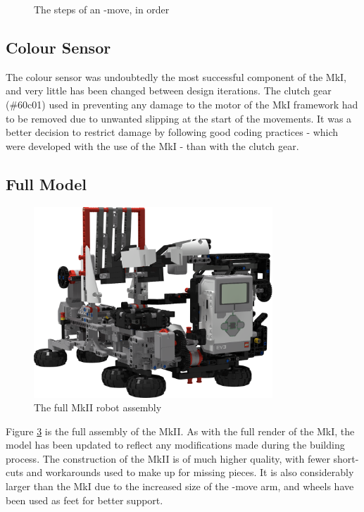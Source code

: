 \documentclass{report}
\newcommand{\legopiece}[1]{(\##1)}
\newcommand{\move}[1]{\uppercase{\texttt{\formatmovesnospace{#1}}}-move}
\begin{document}
\begin{figure}[H]
\begin{subfigure}[b]{0.25\textwidth}
    		\caption{}
    		\label{fig:rdrXMoveArmRaised}
    	\end{subfigure}
    	\caption{The steps of an \move{x}, in order}
    	\label{fig:rdrXMoveRenders}
    \end{figure}
    
    
    \subsection{Colour Sensor}
    
    The colour sensor was undoubtedly the most successful component of the MkI, and very little has been changed between design iterations. The clutch gear \legopiece{60c01} used in preventing any damage to the motor of the MkI framework had to be removed due to unwanted slipping at the start of the movements. It was a better decision to restrict damage by following good coding practices - which were developed with the use of the MkI - than with the clutch gear.
    
    \subsection{Full Model}
    
   	\begin{figure}[H]
    	\centering
   		\includegraphics[width=0.8\textwidth]{Resources/Images/rdrMkIIFull.png}
   		\caption{The full MkII robot assembly}
   		\label{fig:rdrMkIIFull}
    \end{figure}
    
    Figure \ref{fig:rdrMkIIFull} is the full assembly of the MkII. As with the full render of the MkI, the model has been updated to reflect any modifications made during the building process. The construction of the MkII is of much higher quality, with fewer short-cuts and workarounds used to make up for missing pieces. It is also considerably larger than the MkI due to the increased size of the \move{x} arm, and wheels have been used as feet for better support.
    
\end{document}

